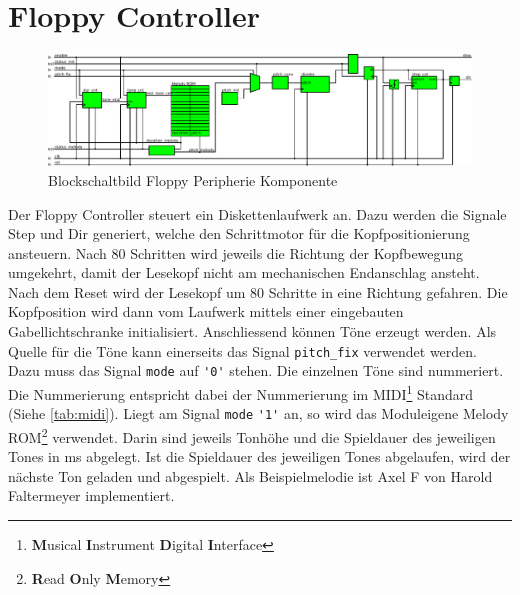 \section{Floppy Controller}
\begin{figure}[h!]
    \centering
    \includegraphics[width=1.0\textwidth]{../organization/floppy_controller.pdf}
    \caption{Blockschaltbild Floppy Peripherie Komponente}
    \label{fig:block}
\end{figure}
\noindent Der Floppy Controller steuert ein Diskettenlaufwerk an. Dazu werden die 
Signale Step und Dir generiert, welche den Schrittmotor für die 
Kopfpositionierung ansteuern. Nach 80 Schritten wird jeweils die Richtung der 
Kopfbewegung umgekehrt, damit der Lesekopf nicht am mechanischen Endanschlag 
ansteht. Nach dem Reset wird der Lesekopf um 80 Schritte in eine Richtung 
gefahren. Die Kopfposition wird dann vom Laufwerk mittels einer eingebauten 
Gabellichtschranke initialisiert. Anschliessend können Töne erzeugt werden. 
Als Quelle für die Töne kann einerseits das Signal \verb!pitch_fix! verwendet 
werden. Dazu muss das Signal \verb!mode! auf \verb!'0'! stehen. Die einzelnen 
Töne sind nummeriert. Die Nummerierung entspricht dabei der Nummerierung im 
MIDI\footnote{\textbf{M}usical \textbf{I}nstrument \textbf{D}igital 
\textbf{I}nterface} Standard (Siehe \autoref{tab:midi}). Liegt am Signal 
\verb!mode! \verb!'1'! an, so wird das Moduleigene Melody 
ROM\footnote{\textbf{R}ead \textbf{O}nly \textbf{M}emory} verwendet. Darin 
sind jeweils Tonhöhe und die Spieldauer des jeweiligen Tones in 
\si{\milli\second} abgelegt. Ist die Spieldauer des jeweiligen Tones 
abgelaufen, wird der nächste Ton geladen und abgespielt. Als Beispielmelodie 
ist Axel F von Harold Faltermeyer implementiert. 
